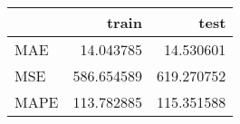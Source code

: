 \begin{tabular}{lrr}
\toprule
{} &       train &        test \\
\midrule
MAE  &   14.043785 &   14.530601 \\
MSE  &  586.654589 &  619.270752 \\
MAPE &  113.782885 &  115.351588 \\
\bottomrule
\end{tabular}
